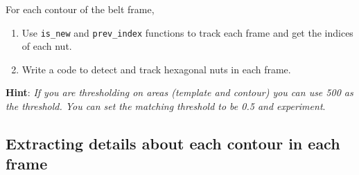 \documentclass[a4paper,11pt]{article}%
\begin{document}
For each contour of the belt frame,

\begin{enumerate}
\def\labelenumi{\arabic{enumi}.}
\tightlist
\item
  Use \texttt{is\_new} and \texttt{prev\_index} functions to track each
  frame and get the indices of each nut.
\item
  Write a code to detect and track hexagonal nuts in each frame.
\end{enumerate}

\textbf{Hint}: \emph{If you are thresholding on areas (template and
contour) you can use 500 as the threshold. You can set the matching
threshold to be 0.5 and experiment}.
\subsection{Extracting details about each contour in each frame}
\end{document}
